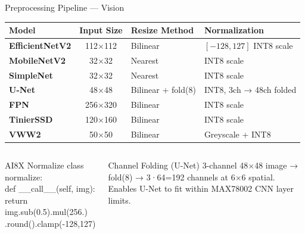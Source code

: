 \documentclass[aspectratio=169,10pt]{beamer}
\begin{document}
\begin{frame}{Preprocessing Pipeline — Vision}
  \renewcommand{\arraystretch}{1.3}
  \begin{tabular}{@{}>{\bfseries\small}l >{\small}c >{\small}l >{\small}l@{}}
    \toprule
    Model & Input Size & Resize Method & Normalization \\
    \midrule
    \rowcolor{ADIBlue!8}
    EfficientNetV2 & 112$\times$112 & Bilinear & $[-128, 127]$ INT8 scale \\
    MobileNetV2 & 32$\times$32 & Nearest & INT8 scale \\
    \rowcolor{ADIBlue!8}
    SimpleNet & 32$\times$32 & Nearest & INT8 scale \\
    U-Net & 48$\times$48 & Bilinear + fold(8) & INT8, 3ch → 48ch folded \\
    \rowcolor{ADIBlue!8}
    FPN & 256$\times$320 & Bilinear & INT8 scale \\
    TinierSSD & 120$\times$160 & Bilinear & INT8 scale \\
    \rowcolor{ADIBlue!8}
    VWW2 & 50$\times$50 & Bilinear & Greyscale + INT8 \\
    \bottomrule
  \end{tabular}

  \vspace{0.4cm}
  \begin{columns}[T]
    \begin{block}{AI8X Normalize}
      {\small\ttfamily
      class normalize:\\
      \quad def \_\_call\_\_(self, img):\\
      \quad\quad return img.sub(0.5).mul(256.)\\
      \quad\quad\quad\quad .round().clamp(-128,127)}
    \end{block}

    \begin{alertblock}{Channel Folding (U-Net)}
      {\small 3-channel 48×48 image → fold(8) → 3·64=192 channels at 6×6 spatial. Enables U-Net to fit within MAX78002 CNN layer limits.}
    \end{alertblock}
  \end{columns}
\end{frame}
\end{document}
